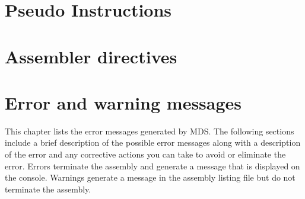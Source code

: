 \clearpage
\section{Pseudo Instructions}
    

\clearpage
\section{Assembler directives}
    

\section{Error and warning messages}
    This chapter lists the error messages generated by MDS. The following sections include a brief description of the possible error messages along with a description of the error and any corrective actions you can take to avoid or eliminate the error. Errors terminate the assembly and generate a message that is displayed on the console. Warnings generate a message in the assembly listing file but do not terminate the assembly.

